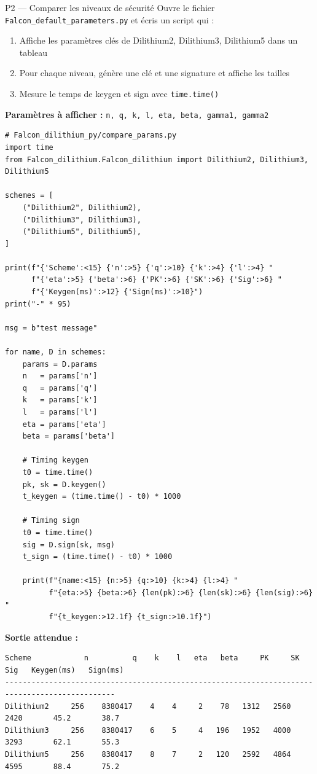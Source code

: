 \documentclass[12pt, a4paper]{article}
\begin{document}
\begin{exercice}{P2 --- Comparer les niveaux de sécurité}
Ouvre le fichier \texttt{Falcon\_default\_parameters.py} et écris un script qui :
\begin{enumerate}
  \item Affiche les paramètres clés de Dilithium2, Dilithium3, Dilithium5 dans un tableau
  \item Pour chaque niveau, génère une clé et une signature et affiche les tailles
  \item Mesure le temps de keygen et sign avec \texttt{time.time()}
\end{enumerate}

\textbf{Paramètres à afficher :} \texttt{n, q, k, l, eta, beta, gamma1, gamma2}
\end{exercice}

\begin{solution}
\begin{lstlisting}[style=python]
# Falcon_dilithium_py/compare_params.py
import time
from Falcon_dilithium.Falcon_dilithium import Dilithium2, Dilithium3, Dilithium5

schemes = [
    ("Dilithium2", Dilithium2),
    ("Dilithium3", Dilithium3),
    ("Dilithium5", Dilithium5),
]

print(f"{'Scheme':<15} {'n':>5} {'q':>10} {'k':>4} {'l':>4} "
      f"{'eta':>5} {'beta':>6} {'PK':>6} {'SK':>6} {'Sig':>6} "
      f"{'Keygen(ms)':>12} {'Sign(ms)':>10}")
print("-" * 95)

msg = b"test message"

for name, D in schemes:
    params = D.params
    n   = params['n']
    q   = params['q']
    k   = params['k']
    l   = params['l']
    eta = params['eta']
    beta = params['beta']

    # Timing keygen
    t0 = time.time()
    pk, sk = D.keygen()
    t_keygen = (time.time() - t0) * 1000

    # Timing sign
    t0 = time.time()
    sig = D.sign(sk, msg)
    t_sign = (time.time() - t0) * 1000

    print(f"{name:<15} {n:>5} {q:>10} {k:>4} {l:>4} "
          f"{eta:>5} {beta:>6} {len(pk):>6} {len(sk):>6} {len(sig):>6} "
          f"{t_keygen:>12.1f} {t_sign:>10.1f}")
\end{lstlisting}

\textbf{Sortie attendue :}
\begin{lstlisting}[style=output]
Scheme            n          q    k    l   eta   beta     PK     SK    Sig   Keygen(ms)   Sign(ms)
-----------------------------------------------------------------------------------------------
Dilithium2     256    8380417    4    4     2    78   1312   2560   2420       45.2       38.7
Dilithium3     256    8380417    6    5     4   196   1952   4000   3293       62.1       55.3
Dilithium5     256    8380417    8    7     2   120   2592   4864   4595       88.4       75.2
\end{lstlisting}
\end{solution}
\end{document}
